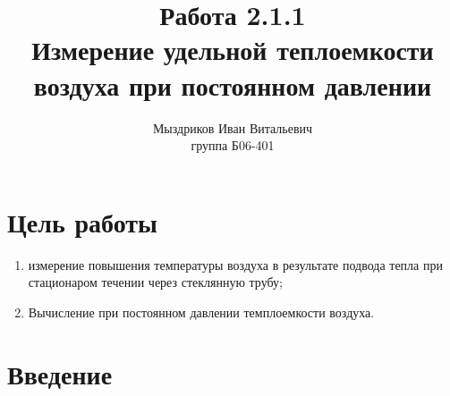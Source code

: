 \documentclass[a4paper, 12pt]{article}%
\author{Мыздриков Иван Витальевич \\
группа Б06-401}
\title{\textbf{Работа 2.1.1 \\ 
Измерение удельной теплоемкости воздуха при постоянном давлении}}
\begin{document}
\maketitle

\section*{Цель работы}
\begin{enumerate}
\item измерение повышения температуры воздуха в результате подвода тепла при стационаром течении через стеклянную трубу;
\item Вычисление при постоянном давлении темплоемкости воздуха.
\end{enumerate}
\section*{Введение}
\end{document}
